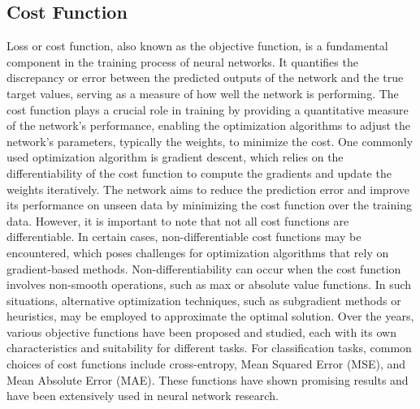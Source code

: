 \subsection{Cost Function}

Loss or cost function, also known as the objective function, is a fundamental component in the training process of neural networks. It quantifies the discrepancy or error between the predicted outputs of the network and the true target values, serving as a measure of how well the network is performing.
The cost function plays a crucial role in training by providing a quantitative measure of the network's performance, enabling the optimization algorithms to adjust the network's parameters, typically the weights, to minimize the cost. One commonly used optimization algorithm is gradient descent, which relies on the differentiability of the cost function to compute the gradients and update the weights iteratively. The network aims to reduce the prediction error and improve its performance on unseen data by minimizing the cost function over the training data.
However, it is important to note that not all cost functions are differentiable. In certain cases, non-differentiable cost functions may be encountered, which poses challenges for optimization algorithms that rely on gradient-based methods. Non-differentiability can occur when the cost function involves non-smooth operations, such as max or absolute value functions. In such situations, alternative optimization techniques, such as subgradient methods or heuristics, may be employed to approximate the optimal solution.
Over the years, various objective functions have been proposed and studied, each with its own characteristics and suitability for different tasks. For classification tasks, common choices of cost functions include cross-entropy, Mean Squared Error (MSE), and Mean Absolute Error (MAE). These functions have shown promising results and have been extensively used in neural network research.
